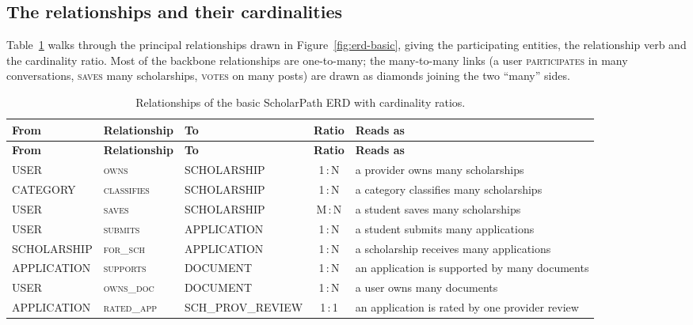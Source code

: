 \documentclass[11pt,a4paper]{article}
\begin{document}
\subsection{The relationships and their cardinalities}

Table~\ref{tab:relationships} walks through the principal relationships drawn in
Figure~\ref{fig:erd-basic}, giving the participating entities, the relationship
verb and the cardinality ratio. Most of the backbone relationships are
one-to-many; the many-to-many links (a user \textsc{participates} in many
conversations, \textsc{saves} many scholarships, \textsc{votes} on many posts)
are drawn as diamonds joining the two ``many'' sides.

\begin{longtable}{@{}>{\raggedright\arraybackslash}p{3.0cm}>{\raggedright\arraybackslash}p{2.4cm}>{\raggedright\arraybackslash}p{3.0cm}cl@{}}
\caption{Relationships of the basic ScholarPath ERD with cardinality ratios.}
\label{tab:relationships}\\
\toprule
\textbf{From} & \textbf{Relationship} & \textbf{To} & \textbf{Ratio} & \textbf{Reads as} \\
\midrule
\endfirsthead
\toprule
\textbf{From} & \textbf{Relationship} & \textbf{To} & \textbf{Ratio} & \textbf{Reads as} \\
\midrule
\endhead
\bottomrule
\endfoot
USER          & \textsc{owns}          & SCHOLARSHIP       & 1\,:\,N & a provider owns many scholarships \\
CATEGORY      & \textsc{classifies}    & SCHOLARSHIP       & 1\,:\,N & a category classifies many scholarships \\
USER          & \textsc{saves}         & SCHOLARSHIP       & M\,:\,N & a student saves many scholarships \\
USER          & \textsc{submits}       & APPLICATION       & 1\,:\,N & a student submits many applications \\
SCHOLARSHIP   & \textsc{for\_sch}      & APPLICATION       & 1\,:\,N & a scholarship receives many applications \\
APPLICATION   & \textsc{supports}      & DOCUMENT          & 1\,:\,N & an application is supported by many documents \\
USER          & \textsc{owns\_doc}     & DOCUMENT          & 1\,:\,N & a user owns many documents \\
APPLICATION   & \textsc{rated\_app}    & SCH\_PROV\_REVIEW & 1\,:\,1 & an application is rated by one provider review \\

\end{longtable}
\end{document}
